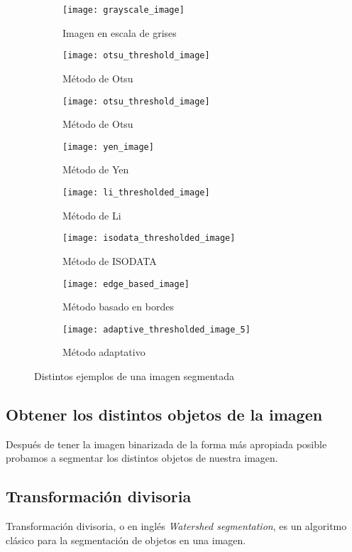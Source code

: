 \begin{figure}
	\centering
	\begin{subfigure}[b]{0.45\textwidth}
        \texttt{[image: grayscale\_image]}
        \caption{Imagen en escala de grises}
    \end{subfigure}
    \begin{subfigure}[b]{0.45\textwidth}
        \texttt{[image: otsu\_threshold\_image]}
        \caption{Método de Otsu}
    \end{subfigure}
    \begin{subfigure}[b]{0.45\textwidth}
        \texttt{[image: otsu\_threshold\_image]}
        \caption{Método de Otsu}
    \end{subfigure}
    \begin{subfigure}[b]{0.45\textwidth}
        \texttt{[image: yen\_image]}
        \caption{Método de Yen}
    \end{subfigure}
    \begin{subfigure}[b]{0.45\textwidth}
        \texttt{[image: li\_thresholded\_image]}
        \caption{Método de Li}
    \end{subfigure}
    \begin{subfigure}[b]{0.45\textwidth}
        \texttt{[image: isodata\_thresholded\_image]}
        \caption{Método de ISODATA}    
    \end{subfigure}
    \begin{subfigure}[b]{0.45\textwidth}
        \texttt{[image: edge\_based\_image]}
        \caption{Método basado en bordes}    
    \end{subfigure}
    \begin{subfigure}[b]{0.45\textwidth}
        \texttt{[image: adaptive\_thresholded\_image\_5]}
        \caption{Método adaptativo}    
    \end{subfigure}
    \caption{Distintos ejemplos de una imagen segmentada}
	\label{fig:5.1.2}
\end{figure} 

\subsection{Obtener los distintos objetos de la imagen}
Después de tener la imagen binarizada de la forma más apropiada posible probamos a segmentar los distintos objetos de nuestra imagen.

\subsection{Transformación divisoria}
Transformación divisoria, o en inglés \textit{Watershed segmentation}, es un algoritmo clásico para la segmentación de objetos en una imagen.

